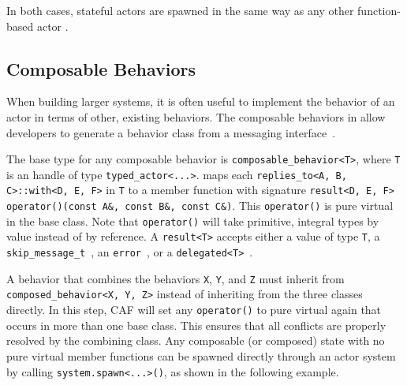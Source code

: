 

In both cases, stateful actors are spawned in the same way as any other function-based actor .



\clearpage
\subsection{Composable Behaviors}
\label{composable-behavior}

When building larger systems, it is often useful to implement the behavior of an actor in terms of other, existing behaviors. The composable behaviors in \lib allow developers to generate a behavior class from a messaging interface~.

The base type for any composable behavior is \lstinline^composable_behavior<T>^, where \lstinline^T^ is an handle of type \lstinline^typed_actor<...>^. \lib maps each \lstinline^replies_to<A, B, C>::with<D, E, F>^ in \lstinline^T^ to a member function with signature \lstinline^result<D, E, F> operator()(const A&, const B&, const C&)^. This \lstinline^operator()^ is pure virtual in the base class. Note that \lstinline^operator()^ will take primitive, integral types by value instead of by reference. A \lstinline^result<T>^ accepts either a value of type \lstinline^T^, a \lstinline^skip_message_t^~, an \lstinline^error^~, or a \lstinline^delegated<T>^~.

A behavior that combines the behaviors \lstinline^X^, \lstinline^Y^, and \lstinline^Z^ must inherit from \lstinline^composed_behavior<X, Y, Z>^ instead of inheriting from the three classes directly. In this step, CAF will set any \lstinline^operator()^ to pure virtual again that occurs in more than one base class. This ensures that all conflicts are properly resolved by the combining class. Any composable (or composed) state with no pure virtual member functions can be spawned directly through an actor system by calling \lstinline^system.spawn<...>()^, as shown in the following example.


